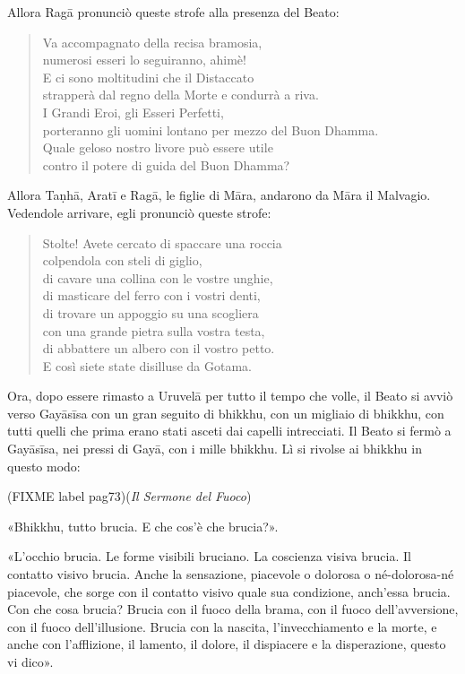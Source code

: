 Allora Ragā pronunciò queste strofe alla presenza del Beato:


\begin{quote}
Va accompagnato della recisa bramosia, \\
numerosi esseri lo seguiranno, ahimè! \\
E ci sono moltitudini che il Distaccato \\
strapperà dal regno della Morte e condurrà a riva. \\
I Grandi Eroi, gli Esseri Perfetti, \\
porteranno gli uomini lontano per mezzo del Buon Dhamma. \\
Quale geloso nostro livore può essere utile \\
contro il potere di guida del Buon Dhamma?
\end{quote}

Allora Taṇhā, Aratī e Ragā, le figlie di Māra, andarono da Māra il
Malvagio. Vedendole arrivare, egli pronunciò queste strofe:


\begin{quote}
Stolte! Avete cercato di spaccare una roccia \\
colpendola con steli di giglio, \\
di cavare una collina con le vostre unghie, \\
di masticare del ferro con i vostri denti, \\
di trovare un appoggio su una scogliera \\
con una grande pietra sulla vostra testa, \\
di abbattere un albero con il vostro petto. \\
E così siete state disilluse da Gotama.
\end{quote}



 Ora, dopo essere rimasto a Uruvelā per tutto il tempo che
volle, il Beato si avviò verso Gayāsīsa con un gran seguito di bhikkhu,
con un migliaio di bhikkhu, con tutti quelli che prima erano stati
asceti dai capelli intrecciati. Il Beato si fermò a Gayāsīsa, nei pressi
di Gayā, con i mille bhikkhu. Lì si rivolse ai bhikkhu in questo modo:


(FIXME label pag73)(\emph{Il Sermone del Fuoco})


«Bhikkhu, tutto brucia. E che cos’è che brucia?».


«L’occhio brucia. Le forme visibili bruciano. La coscienza visiva
brucia. Il contatto visivo brucia. Anche la sensazione, piacevole o
dolorosa o né-dolorosa-né piacevole, che sorge con il contatto visivo
quale sua condizione, anch’essa brucia. Con che cosa brucia? Brucia con
il fuoco della brama, con il fuoco dell’avversione, con il fuoco
dell’illusione. Brucia con la nascita, l’invecchiamento e la morte, e
anche con l’afflizione, il lamento, il dolore, il dispiacere e la
disperazione, questo vi dico».


